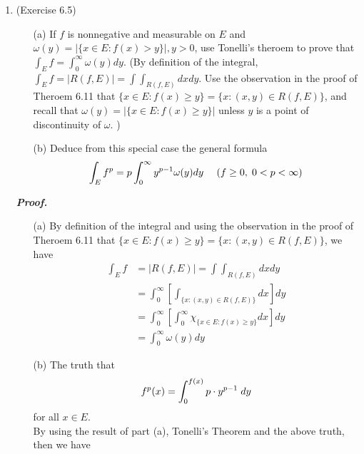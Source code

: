 \documentclass[a4paper,11pt]{article}
\begin{document}
\begin{enumerate}
	


	\item (Exercise 6.5)
		\begin{enumerate}
			\item [(a)] If $f$ is nonnegative and measurable on $E$ and $\omega(y) = |\{ x \in E: f(x) > y \}|, y > 0$, use Tonelli's theroem to prove that $\int_E f = \int_0^\infty \omega(y) dy$. (By definition of the integral, $\int_E f = |R(f,E)| = \int \int_{R(f,E)} dx dy$. Use the observation in the proof of Theroem 6.11 that $\{ x \in E: f(x) \geq y \} = \{ x: (x,y) \in R(f,E) \}$, and recall that $\omega(y) = |\{ x \in E: f(x) \geq y \}|$ unless $y$ is a point of discontinuity of $\omega$. )

			\item [(b)] Deduce from this special case the general formula
			$$\int_E f^p = p \int_0^\infty y^{p-1} \omega(y) dy \hspace{0.4cm} \left( f \geq 0, \hspace{0.1cm} 0 < p < \infty \right)$$
		\end{enumerate}

 		\textit{\textbf {Proof.}}

 		\begin{enumerate}
 			\item [(a)] By definition of the integral and using the observation in the proof of Theroem 6.11 that $\{ x \in E: f(x) \geq y \} = \{ x: (x,y) \in R(f,E) \}$, we have
 			$$\begin{aligned}
 			\int_E f
 			&= |R(f,E)| = \int \int_{R(f,E)} dx dy\\
 			&= \int_0^\infty \left[ \int_{\{ x: (x,y) \in R(f,E) \}} dx \right] dy\\
 			&= \int_0^\infty \left[ \int_0^\infty \chi_{\{ x \in E: f(x) \geq y \}} dx \right] dy\\
 			&= \int_0^\infty \omega(y) dy
 			\end{aligned}$$



 			\item [(b)] The truth that
 			$$f^p(x) = \int_0^{f(x)} p \cdot y^{p-1} \hspace{0.1cm} dy$$
 			for all $x \in E$.\\

 			By using the result of part (a), Tonelli's Theorem and the above truth, then we have


\end{enumerate}
\end{enumerate}
\end{document}
